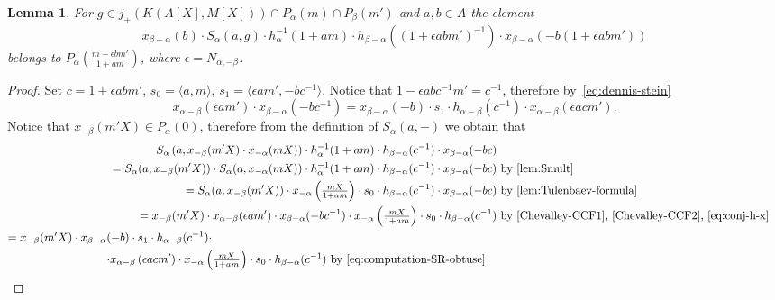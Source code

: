 \documentclass[oneside, 8pt]{amsart}
\newtheorem{lemma}{Lemma}
\theoremstyle{remark}
\theoremstyle{definition}
\numberwithin{lemma}{section}
\numberwithin{prop}{section}
\numberwithin{corollary}{section}
\numberwithin{externaltheorem}{section}
\numberwithin{equation}{section}
\begin{document}
\begin{lemma} \label{SR:obtuse} For $g \in j_+(K(A[X], M[X])) \cap P_\alpha(m) \cap P_\beta(m')$ and $a, b\in A$ the element \[ x_{\beta - \alpha}(b) \cdot S_\alpha(a, g) \cdot h_{\alpha}^{-1}(1+am)\cdot h_{\beta - \alpha}((1 + \epsilon abm')^{-1})\cdot x_{\beta - \alpha}(-b(1 + \epsilon abm')) \]
 belongs to $P_\alpha\left(\tfrac{m - \epsilon bm'}{1+am}\right)$, where $\epsilon = N_{\alpha, -\beta}$.
\end{lemma}
\begin{proof} Set $c = 1 + \epsilon a b m'$, $s_0 = \langle a, m \rangle$, $s_1 = \langle \epsilon am', -bc^{-1} \rangle$.
Notice that $1 - \epsilon abc^{-1}m' = c^{-1}$, therefore by~\eqref{eq:dennis-stein}
\begin{equation} \label{eq:computation-SR-obtuse} x_{\alpha-\beta}(\epsilon am') \cdot x_{\beta-\alpha}(-bc^{-1}) = x_{\beta-\alpha}(-b) \cdot s_1 \cdot h_{\alpha-\beta}(c^{-1}) \cdot x_{\alpha-\beta}(\epsilon acm').\end{equation}
Notice that $x_{-\beta}(m'X) \in P_\alpha(0)$, therefore from the definition of $S_\alpha(a, -)$ we obtain that
\begin{align*}
 S_\alpha\left(a, x_{-\beta}(m'X) \cdot x_{-\alpha}(mX)\right) \cdot h_{\alpha}^{-1}(1+am)\cdot h_{\beta-\alpha}(c^{-1})\cdot x_{\beta - \alpha}(-bc) \\ 
 = S_\alpha(a, x_{-\beta}(m'X)) \cdot S_\alpha(a, x_{-\alpha}(mX)) \cdot h_\alpha^{-1} (1 + am) \cdot h_{\beta - \alpha}(c^{-1}) \cdot x_{\beta - \alpha}(-bc) &\text{ by~\cref{lem:Smult}}\\
 = S_\alpha(a, x_{-\beta}(m'X)) \cdot x_{-\alpha}\left(\tfrac{mX}{1+am}\right) \cdot s_0 \cdot h_{\beta - \alpha}(c^{-1}) \cdot x_{\beta - \alpha}(-bc) &\text{ by~\cref{lem:Tulenbaev-formula}}\\
 = x_{-\beta}(m'X) \cdot x_{\alpha - \beta}(\epsilon am') \cdot x_{\beta - \alpha}(-bc^{-1}) \cdot x_{-\alpha}\left(\tfrac{mX}{1+am}\right) \cdot s_0 \cdot h_{\beta - \alpha}(c^{-1}) &\text{ by~\eqref{Chevalley-CCF1},~\eqref{Chevalley-CCF2}, \eqref{eq:conj-h-x}}\\
 \begin{split}= x_{-\beta}(m'X) \cdot x_{\beta - \alpha}(-b) \cdot s_1 \cdot h_{\alpha-\beta}(c^{-1}) \cdot \hspace{100pt} \\ \cdot x_{\alpha-\beta}\left(\epsilon acm'\right) \cdot x_{-\alpha}\left(\tfrac{mX}{1+am}\right) \cdot s_0 \cdot h_{\beta - \alpha}(c^{-1}) &\text{ by~\eqref{eq:computation-SR-obtuse}} \end{split}\\

\end{align*}
\end{proof}
\end{document}
